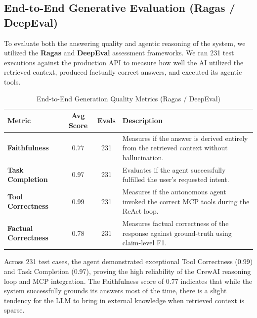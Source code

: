 \documentclass[12pt]{article}
\begin{document}
\subsection{End-to-End Generative Evaluation (Ragas / DeepEval)}
To evaluate both the answering quality and agentic reasoning of the system, we utilized the \textbf{Ragas} and \textbf{DeepEval} assessment frameworks. We ran 231 test executions against the production API to measure how well the AI utilized the retrieved context, produced factually correct answers, and executed its agentic tools.

\begin{table}[ht]
\centering
\caption{End-to-End Generation Quality Metrics (Ragas / DeepEval)}
\label{tab:ragas_bench}
\begin{tabular}{|l|c|c|p{6cm}|}
\hline
\textbf{Metric} & \textbf{Avg Score} & \textbf{Evals} & \textbf{Description} \\ \hline
\textbf{Faithfulness} & 0.77 & 231 & Measures if the answer is derived entirely from the retrieved context without hallucination. \\ \hline
\textbf{Task Completion} & 0.97 & 231 & Evaluates if the agent successfully fulfilled the user's requested intent. \\ \hline
\textbf{Tool Correctness} & 0.99 & 231 & Measures if the autonomous agent invoked the correct MCP tools during the ReAct loop. \\ \hline
\textbf{Factual Correctness} & 0.78 & 231 & Measures factual correctness of the response against ground-truth using claim-level F1. \\ \hline
\end{tabular}
\end{table}

Across 231 test cases, the agent demonstrated exceptional Tool Correctness (0.99) and Task Completion (0.97), proving the high reliability of the CrewAI reasoning loop and MCP integration. The Faithfulness score of 0.77 indicates that while the system successfully grounds its answers most of the time, there is a slight tendency for the LLM to bring in external knowledge when retrieved context is sparse.
\end{document}
